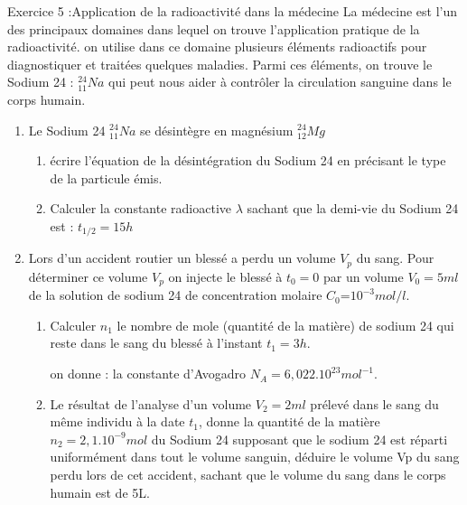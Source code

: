 \documentclass[12pt, french]{article}
\begin{document}
\begin{Box2}{Exercice 5 :Application de la radioactivité dans la médecine }
La médecine est l'un des principaux domaines dans lequel on trouve l’application pratique de la
radioactivité. on utilise dans ce domaine plusieurs éléments radioactifs pour diagnostiquer et traitées
quelques maladies. Parmi ces éléments, on trouve le Sodium 24 : $_{11}^{24}Na$ qui peut nous aider à contrôler la circulation sanguine dans le corps humain. 

\begin{enumerate}
	\item Le Sodium 24 $_{11}^{24}Na$ se désintègre en magnésium $_{12}^{24}Mg$  
		\begin{enumerate}
			\item écrire l’équation de la désintégration du Sodium 24 en précisant le type de la particule émis.
			\item Calculer la constante radioactive $\lambda$ sachant que la demi-vie du Sodium 24 est : $t_{1/2} = 15h$
		\end{enumerate}
	\item Lors d’un accident routier un blessé a perdu un volume $V_p$ du sang. Pour déterminer ce volume $V_p$ on injecte le blessé à $t_0 =0$ par un volume $V_0 = 5 ml$ de la solution de sodium 24 de concentration molaire   $C_0$=$10^{-3} mol/l$.
		\begin{enumerate}
			\item Calculer $n_1$ le nombre de mole (quantité de la matière) de sodium 24 qui reste dans le sang du
blessé à l’instant $t_1 = 3h$.

on donne : la constante d’Avogadro $N_A = 6,022.10^{23} mol^{-1}.$
\item Le résultat de l’analyse d’un volume $V_2 = 2ml$ prélevé dans le sang du même individu à la
	date $t_1$, donne la quantité de la matière $n_2 =2,1.10^{-9} mol$ du Sodium 24 supposant que le sodium 24 est réparti uniformément dans tout le volume sanguin, déduire le
volume Vp du sang perdu lors de cet accident, sachant que le volume du sang dans le corps
humain est de 5L.
		\end{enumerate}
\end{enumerate}



\end{Box2}


\end{document}
